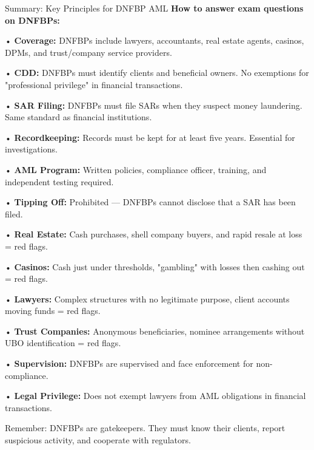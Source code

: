 \documentclass[11pt,a4paper]{beamer}
\begin{document}
\begin{frame}{Summary: Key Principles for DNFBP AML}
\tiny
\noindent\textbf{How to answer exam questions on DNFBPs:}

\vspace{0.1cm}
\noindent• \textbf{Coverage:} DNFBPs include lawyers, accountants, real estate agents, casinos, DPMs, and trust/company service providers.

\vspace{0.1cm}
\noindent• \textbf{CDD:} DNFBPs must identify clients and beneficial owners. No exemptions for "professional privilege" in financial transactions.

\vspace{0.1cm}
\noindent• \textbf{SAR Filing:} DNFBPs must file SARs when they suspect money laundering. Same standard as financial institutions.

\vspace{0.1cm}
\noindent• \textbf{Recordkeeping:} Records must be kept for at least five years. Essential for investigations.

\vspace{0.1cm}
\noindent• \textbf{AML Program:} Written policies, compliance officer, training, and independent testing required.

\vspace{0.1cm}
\noindent• \textbf{Tipping Off:} Prohibited — DNFBPs cannot disclose that a SAR has been filed.

\vspace{0.1cm}
\noindent• \textbf{Real Estate:} Cash purchases, shell company buyers, and rapid resale at loss = red flags.

\vspace{0.1cm}
\noindent• \textbf{Casinos:} Cash just under thresholds, "gambling" with losses then cashing out = red flags.

\vspace{0.1cm}
\noindent• \textbf{Lawyers:} Complex structures with no legitimate purpose, client accounts moving funds = red flags.

\vspace{0.1cm}
\noindent• \textbf{Trust Companies:} Anonymous beneficiaries, nominee arrangements without UBO identification = red flags.

\vspace{0.1cm}
\noindent• \textbf{Supervision:} DNFBPs are supervised and face enforcement for non-compliance.

\vspace{0.1cm}
\noindent• \textbf{Legal Privilege:} Does not exempt lawyers from AML obligations in financial transactions.

\vspace{0.3cm}
\centering
{Remember: DNFBPs are gatekeepers. They must know their clients, report suspicious activity, and cooperate with regulators.}
\end{frame}
\end{document}
